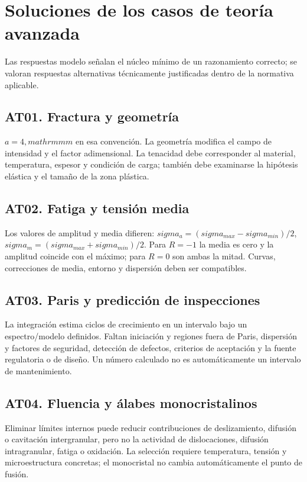 \chapter{Soluciones de los casos de teoría avanzada}
\label{ch:matmo-teoria-avanzada-sol}
\noindent Las respuestas modelo señalan el núcleo mínimo de un razonamiento correcto; se valoran respuestas alternativas técnicamente justificadas dentro de la normativa aplicable.

\section*{AT01. Fractura y geometría}
$a=4,mathrm{mm}$ en esa convención. La geometría modifica el campo de intensidad y el factor adimensional. La tenacidad debe corresponder al material, temperatura, espesor y condición de carga; también debe examinarse la hipótesis elástica y el tamaño de la zona plástica.

\section*{AT02. Fatiga y tensión media}
Los valores de amplitud y media difieren: $sigma_a=(sigma_{max}-sigma_{min})/2$, $sigma_m=(sigma_{max}+sigma_{min})/2$. Para $R=-1$ la media es cero y la amplitud coincide con el máximo; para $R=0$ son ambas la mitad. Curvas, correcciones de media, entorno y dispersión deben ser compatibles.

\section*{AT03. Paris y predicción de inspecciones}
La integración estima ciclos de crecimiento en un intervalo bajo un espectro/modelo definidos. Faltan iniciación y regiones fuera de Paris, dispersión y factores de seguridad, detección de defectos, criterios de aceptación y la fuente regulatoria o de diseño. Un número calculado no es automáticamente un intervalo de mantenimiento.

\section*{AT04. Fluencia y álabes monocristalinos}
Eliminar límites internos puede reducir contribuciones de deslizamiento, difusión o cavitación intergranular, pero no la actividad de dislocaciones, difusión intragranular, fatiga o oxidación. La selección requiere temperatura, tensión y microestructura concretas; el monocristal no cambia automáticamente el punto de fusión.

